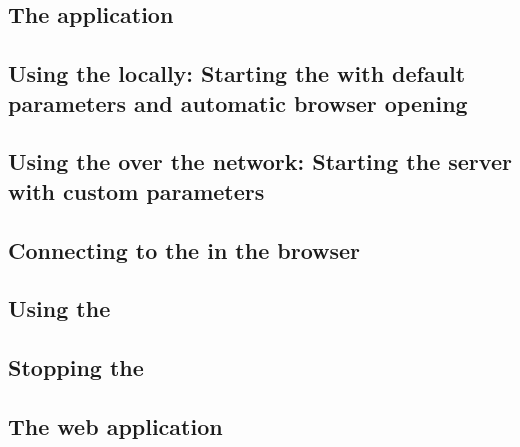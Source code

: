 \subsection{The \dash{} application}


\subsection{Using the \dash{} locally: Starting the \dash{} with default parameters and automatic browser opening}
\label{TasksDashDefault}


\subsection{Using the \dash{} over the network{}: Starting the \dash{} server with custom parameters}
\label{TasksDashCustom}


\subsection{Connecting to the \dash{} in the browser}
\label{TasksDashConnect}


\subsection{Using the \dash{}}
\label{TasksDashUse}


\subsection{Stopping the \dash{}}
\label{TasksDashStop}


\subsection{The \dash{} web application}
\label{TasksDashWebApp}

